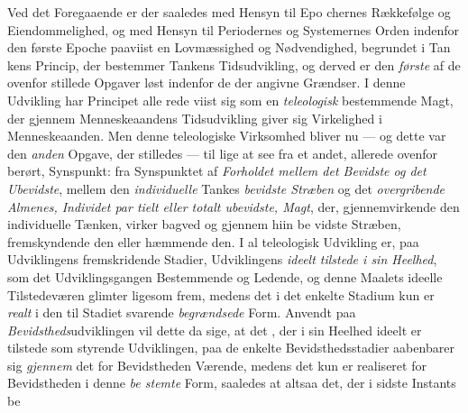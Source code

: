 Ved det Foregaaende er der saaledes med Hensyn til Epo\-%
chernes Rækkefølge og Eiendommelighed, og med Hensyn til
Periodernes og Systemernes Orden indenfor den første Epoche
paaviist en Lovmæssighed og Nødvendighed, begrundet i Tan\-%
kens Princip, der bestemmer Tankens Tidsudvikling, og derved
er den \emph{første} af de ovenfor stillede Opgaver løst indenfor de
der angivne Grændser. I denne Udvikling har Principet alle\-%
rede viist sig som en \emph{teleologisk} bestemmende Magt, der
gjennem Menneskeaandens Tidsudvikling giver sig Virkelighed
i Menneskeaanden. Men denne teleologiske Virksomhed bliver
nu --- og dette var den \emph{anden} Opgave, der stilledes --- til\-%
lige at see fra et andet, allerede ovenfor berørt, Synspunkt:
fra Synspunktet af \emph{Forholdet mellem det Bevidste og
det Ubevidste}, mellem den \emph{individuelle} Tankes \emph{bevidste
Stræben} og det \emph{overgribende Almenes, Individet par\-%
tielt eller totalt ubevidste, Magt}, der, gjennemvirkende
den individuelle Tænken, virker bagved og gjennem hiin be\-%
vidste Stræben, fremskyndende den eller hæmmende den. I
al teleologisk Udvikling er, paa Udviklingens fremskridende
Stadier, Udviklingens  \emph{ideelt tilstede i sin Heelhed},
som det Udviklingsgangen Bestemmende og Ledende, og denne
Maalets ideelle Tilstedeværen glimter ligesom frem, medens det
i det enkelte Stadium kun er \emph{realt} i den til Stadiet svarende
\emph{begrændsede} Form. Anvendt paa \emph{Bevidstheds}udviklingen
vil dette da sige, at det , der i sin Heelhed ideelt er tilstede
som styrende Udviklingen, paa de enkelte Bevidsthedsstadier
aabenbarer sig \emph{gjennem} det for Bevidstheden Værende,
medens det kun er realiseret for Bevidstheden i denne \emph{be\-%
stemte} Form, saaledes at altsaa det, der i sidste Instants be\-%
